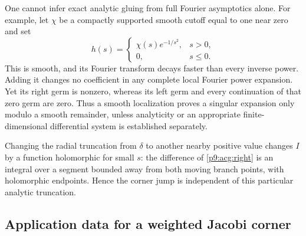 \documentclass[11pt,a4paper]{article}
\theoremstyle{definition}
\theoremstyle{remark}
\numberwithin{equation}{section}
\begin{document}
One cannot infer exact analytic gluing from full Fourier asymptotics
alone. For example, let $\chi$ be a compactly supported smooth cutoff
equal to one near zero and set
\[
 h(s)=\begin{cases}\chi(s)e^{-1/s^2},&s>0,\\0,&s\leq0.\end{cases}
\]
This is smooth, and its Fourier transform decays faster than every
inverse power. Adding it changes no coefficient in any complete
local Fourier power expansion. Yet its right germ is nonzero,
whereas its left germ and every continuation of that zero germ are
zero. Thus a smooth localization proves a singular expansion only
modulo a smooth remainder, unless analyticity or an appropriate
finite-dimensional differential system is established separately.

Changing the radial truncation from $\delta$ to another nearby
positive value changes $I$ by a function holomorphic for small $s$:
the difference of \eqref{p9:acg:right} is an integral over a segment
bounded away from both moving branch points, with holomorphic
endpoints. Hence the corner jump is independent of this particular
analytic truncation.

\subsection{Application data for a weighted Jacobi corner}
\end{document}
